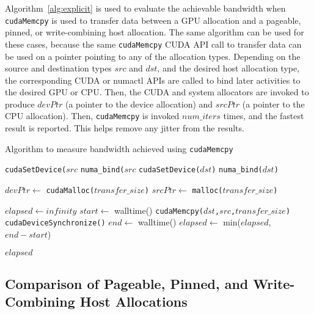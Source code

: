 Algorithm~\ref{alg:explicit} is used to evaluate the achievable bandwidth when \texttt{cudaMemcpy} is used to transfer data between a GPU allocation and a pageable, pinned, or write-combining host allocation. 
The same algorithm can be used for these cases, because the same \texttt{cudaMemcpy} CUDA API call to transfer data can be used on a pointer pointing to any of the allocation types.
Depending on the source and destination types $src$ and $dst$, and the desired host allocation type, the corresponding CUDA or numactl APIs are called to bind later activities to the desired GPU or CPU.
Then, the CUDA and system allocators are invoked to produce $devPtr$ (a pointer to the device allocation) and $srcPtr$ (a pointer to the CPU allocation).
Then, \texttt{cudaMemcpy} is invoked $num\_iters$ times, and the fastest result is reported.
This helps remove any jitter from the results.

\begin{algorithm}
    \caption{Algorithm to measure bandwidth achieved using \texttt{cudaMemcpy}}
    \label{alg:explicit}
    \begin{algorithmic}[1]
    \Statex
            \State \texttt{cudaSetDevice($src$}
        \Else {}
            \State \texttt{numa\_bind($src$}
        \EndIf
        \State \texttt{cudaSetDevice($dst$)}
        \Else {}
        \State \texttt{numa\_bind($dst$)}
        \EndIf

        \State $devPtr \gets$ \texttt{cudaMalloc($transfer\_size$)} 
        \State $srcPtr \gets$ \texttt{malloc($transfer\_size$)} 

        \State $elapsed \gets infinity$ 
            \State $start \gets$ walltime()
            \State \texttt{cudaMemcpy($dst$,$src$,$transfer\_size$)}
            \State \texttt{cudaDeviceSynchronize()}
            \State $end \gets$ walltime()
            \State $elapsed \gets$ min($elapsed$, $end-start$)
        \EndFor

        \Return $elapsed$
    \EndFunction

    \end{algorithmic}
\end{algorithm}

\subsection{Comparison of Pageable, Pinned, and Write-Combining Host Allocations}
\label{sec:explicit-pageable-pinned-wc}

